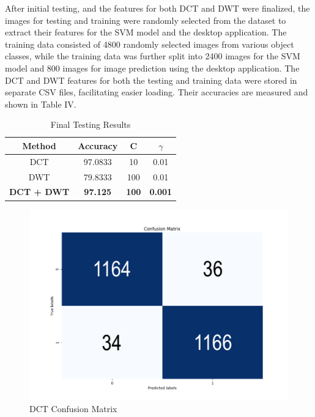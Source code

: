\documentclass[journal]{./IEEE/IEEEtran}
\begin{document}
After initial testing, and the features for both DCT and DWT were finalized, the images for testing and training were randomly selected from the dataset to extract their features for the SVM model and the desktop application. The training data consisted of 4800 randomly selected images from various object classes, while the training data was further split into 2400 images for the SVM model and 800 images for image prediction using the desktop application. The DCT and DWT features for both the testing and training data were stored in separate CSV files, facilitating easier loading. Their accuracies are measured and shown in Table IV. 


\begin{table}[H]
\centering
\begin{tabular}{|c|c|c|c|}
\hline
Method             & Accuracy        & C            & $\gamma$            \\ \hline
DCT                & 97.0833         & 10           & 0.01           \\ \hline
DWT                & 79.8333         & 100          & 0.01           \\ \hline
\textbf{DCT + DWT} & \textbf{97.125} & \textbf{100} & \textbf{0.001} \\ \hline
\end{tabular}
\caption{Final Testing Results}
\end{table}


\begin{figure}[!ht]
    \centering
    \includegraphics{imgs/DCT_conf_mat.png}
    \caption{DCT Confusion Matrix}
    \label{fig:enter-label}
\end{figure}
\end{document}
